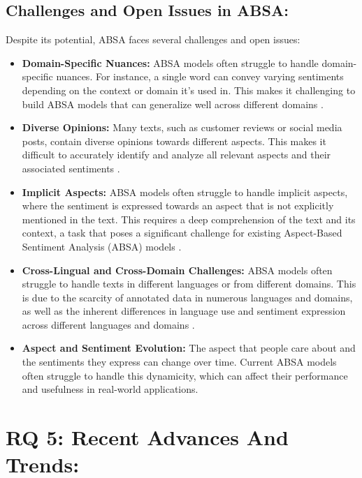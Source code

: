 \documentclass{article}
\begin{document}
\subsection{Challenges and Open Issues in ABSA: }
Despite its potential, ABSA faces several challenges and open issues: 
\begin{itemize}
    \item \textbf{Domain-Specific Nuances: } ABSA models often struggle to handle domain-specific nuances. For instance, a single word can convey varying sentiments depending on the context or domain it's used in. This makes it challenging to build ABSA models that can generalize well across different domains \cite{NazirIssues&Chall2023}\cite{doi:10.1504/IJESMS.2021.119892}.
    \item \textbf{Diverse Opinions: } Many texts, such as customer reviews or social media posts, contain diverse opinions towards different aspects. This makes it difficult to accurately identify and analyze all relevant aspects and their associated sentiments \cite{NazirIssues&Chall2023}.
    \item \textbf{Implicit Aspects: } ABSA models often struggle to handle implicit aspects, where the sentiment is expressed towards an aspect that is not explicitly mentioned in the text. This requires a deep comprehension of the text and its context, a task that poses a significant challenge for existing Aspect-Based Sentiment Analysis (ABSA) models \cite{NazirIssues&Chall2023}.
    \item \textbf{Cross-Lingual and Cross-Domain Challenges: } ABSA models often struggle to handle texts in different languages or from different domains. This is due to the scarcity of annotated data in numerous languages and domains, as well as the inherent differences in language use and sentiment expression across different languages and domains \cite{Verma2022ASO}.
    \item \textbf{Aspect and Sentiment Evolution: } The aspect that people care about and the sentiments they express can change over time. Current ABSA models often struggle to handle this dynamicity, which can affect their performance and usefulness in real-world applications\cite{NazirIssues&Chall2023}.
    
\end{itemize}

\section{RQ 5: Recent Advances And Trends: }
\end{document}
